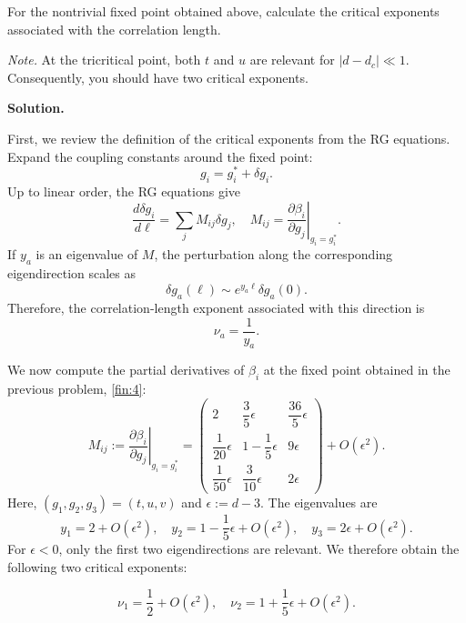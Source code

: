 \documentclass[11pt,a4paper]{article}
\newcounter{problem}
\newcounter{saveequation}
\newenvironment{solution}
{
	\par
	\setcounter{saveequation}{\value{equation}}
	\begingroup
	\setcounter{equation}{0}
	\renewcommand{\theequation}{\arabic{problem}.\arabic{equation}}
	\renewcommand{\theHequation}{sol.\arabic{problem}.\arabic{equation}}
	\noindent\textbf{Solution.}\quad
}
{
	\par
	\endgroup
	\setcounter{equation}{\value{saveequation}}
}
\begin{document}
	\begin{problembox}
		For the nontrivial fixed point obtained above, calculate the critical exponents associated with the correlation length.

		\textit{Note.} At the tricritical point, both $t$ and $u$ are relevant for $\lvert d-d_c\rvert\ll 1$. Consequently, you should have two critical exponents.
	\end{problembox}
	\begin{solution}
		First, we review the definition of the critical exponents from the RG equations. Expand the coupling constants around the fixed point:
		\[
		g_i=g_i^*+\delta g_i.
		\]
		Up to linear order, the RG equations give
		\[
		\frac{d\delta g_i}{d\ell}
		=
		\sum_j M_{ij}\delta g_j,
		\quad
		M_{ij}
		=
		\left.
		\frac{\partial\beta_i}{\partial g_j}
		\right|_{g_i=g_i^*}.
		\]
		If $y_a$ is an eigenvalue of $M$, the perturbation along the corresponding eigendirection scales as
		\[
		\delta g_a(\ell)\sim e^{y_a\ell}\delta g_a(0).
		\]
		Therefore, the correlation-length exponent associated with this direction is
		\[
		\boxed{\nu_a=\frac{1}{y_a}}.
		\]
		
		We now compute the partial derivatives of $\beta_i$ at the fixed point obtained in the previous problem, \ref{fin:4}:
		\begin{equation}
			M_{ij}
			:=
			\left.
			\frac{\partial\beta_i}{\partial g_j}
			\right|_{g_i=g_i^*}
			=
			\begin{pmatrix}
				2 & \dfrac{3}{5}\epsilon & \dfrac{36}{5}\epsilon
				\\[0.5em]
				\dfrac{1}{20}\epsilon & 1-\dfrac{1}{5}\epsilon & 9\epsilon
				\\[0.5em]
				\dfrac{1}{50}\epsilon & \dfrac{3}{10}\epsilon & 2\epsilon
			\end{pmatrix}
			+O(\epsilon^2).
		\end{equation}
		Here, $(g_1,g_2,g_3)=(t,u,v)$ and $\epsilon:=d-3$. The eigenvalues are
		\begin{equation}
			y_1=2+O(\epsilon^2),
			\quad
			y_2=1-\frac{1}{5}\epsilon+O(\epsilon^2),
			\quad
			y_3=2\epsilon+O(\epsilon^2).
		\end{equation}
		For $\epsilon<0$, only the first two eigendirections are relevant. We therefore obtain the following two critical exponents:
		\begin{finalanswer}
			\begin{equation}
				\label{fin:5}
				\nu_1=\frac{1}{2}+O(\epsilon^2),
				\quad
				\nu_2=1+\frac{1}{5}\epsilon+O(\epsilon^2).
			\end{equation}
		\end{finalanswer}
	\end{solution}
\end{document}
